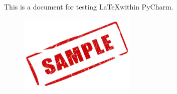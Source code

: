 This is a document for testing \LaTeX within PyCharm.\cite{small}

\begin{figure}
    \centering
    \includegraphics[width=0.5\textwidth]{images/sample.jpg}
\end{figure}